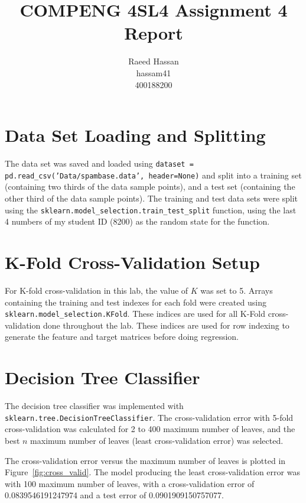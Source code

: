 \documentclass[12pt]{article}
\title{COMPENG 4SL4 Assignment 4 Report}
\author{
    Raeed Hassan \\
    hassam41 \\
    400188200
}
\begin{document}
\maketitle
\clearpage

\section*{Data Set Loading and Splitting}
The data set was saved and loaded using \texttt{dataset = pd.read\_csv('Data/spambase.data', header=None)} and split into a training set (containing two thirds of the data sample points), and a test set (containing the other third of the data sample points). The training and test data sets were split using the \texttt{sklearn.model\_selection.train\_test\_split} function, using the last 4 numbers of my student ID (8200) as the random state for the function.

\section*{K-Fold Cross-Validation Setup}
For K-fold cross-validation in this lab, the value of $K$ was set to 5. Arrays containing the training and test indexes for each fold were created using \texttt{sklearn.model\_selection.KFold}. These indices are used for all K-Fold cross-validation done throughout the lab. These indices are used for row indexing to generate the feature and target matrices before doing regression.


\section*{Decision Tree Classifier}
The decision tree classifier was implemented with \texttt{sklearn.tree.DecisionTreeClassifier}. The cross-validation error with 5-fold cross-validation was calculated for 2 to 400 maximum number of leaves, and the best $n$ maximum number of leaves (least cross-validation error) was selected.

The cross-validation error versus the maximum number of leaves is plotted in Figure~\ref{fig:cross_valid}. The model producing the least cross-validation error was with 100 maximum number of leaves, with a cross-validation error of 0.0839546191247974 and a test error of 0.0901909150757077.
\end{document}
